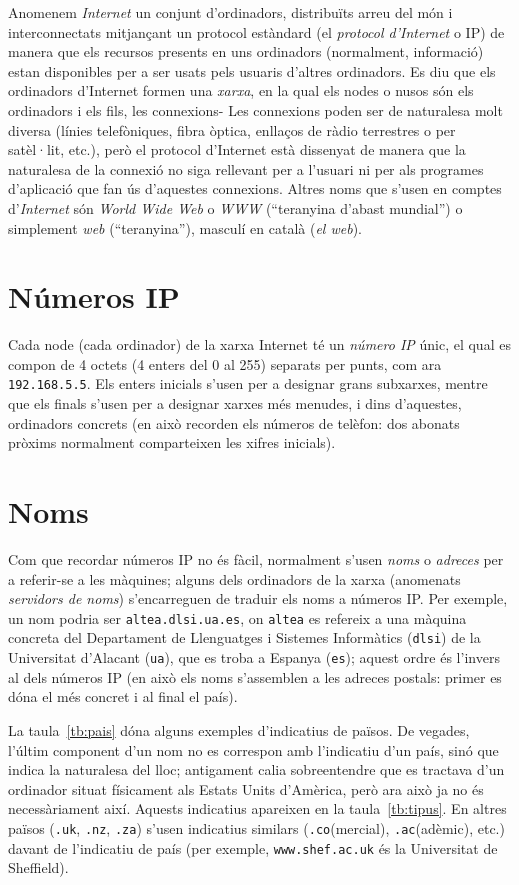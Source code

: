Anomenem \emph{Internet} un conjunt d'ordinadors, distribuïts arreu
del món i interconnectats mitjançant un protocol estàndard (el
\emph{protocol d'Internet} o IP) de manera que els recursos presents
en uns ordinadors (normalment, informació) estan disponibles per a ser
usats pels usuaris d'altres ordinadors. Es diu que els ordinadors
d'Internet formen una \emph{xarxa}, en la qual els nodes o nusos són
els ordinadors i els fils, les connexions- Les connexions poden ser de
naturalesa molt diversa (línies telefòniques, fibra òptica, enllaços
de ràdio terrestres o per satèl·lit, etc.), però el protocol
d'Internet està dissenyat de manera que la naturalesa de la connexió
no siga rellevant per a l'usuari ni per als programes d'aplicació que
fan ús d'aquestes connexions. Altres noms que s'usen en comptes
d'\emph{Internet} són \emph{World Wide Web} o \emph{WWW} (``teranyina
d'abast mundial'') o simplement \emph{web} (``teranyina''), masculí en
català (\emph{el web}).

\section{Números IP}
Cada node (cada ordinador) de la xarxa Internet té un {\em número IP}
únic, el qual es compon de 4 octets (4 enters del 0 al 255) separats
per punts, com ara {\tt 192.168.5.5}. Els enters inicials s'usen per a
designar grans subxarxes, mentre que els finals s'usen per a designar
xarxes més menudes, i dins d'aquestes, ordinadors concrets (en això
recorden els números de telèfon: dos abonats pròxims normalment
comparteixen les xifres inicials).

\section{Noms}
Com que recordar números IP no és fàcil, normalment s'usen \emph{noms}
o \emph{adreces} per a referir-se a les màquines; alguns dels
ordinadors de la xarxa (anomenats \emph{servidors de noms})
s'encarreguen de traduir els noms a números IP.  Per exemple, un nom
podria ser \texttt{altea.dlsi.ua.es}, on \texttt{altea} es refereix a
una màquina concreta del Departament de Llenguatges i Sistemes
Informàtics (\texttt{dlsi}) de la Universitat d'Alacant (\texttt{ua}),
que es troba a Espanya (\texttt{es}); aquest ordre és l'invers al dels
números IP (en això els noms s'assemblen a les adreces postals: primer
es dóna el més concret i al final el país).

La taula~\ref{tb:pais} dóna alguns exemples d'indicatius de països. De
vegades, l'últim component d'un nom no es correspon amb l'indicatiu
d'un país, sinó que indica la naturalesa del lloc; antigament calia
sobreentendre que es tractava d'un ordinador situat físicament als
Estats Units d'Amèrica, però ara això ja no és necessàriament
així. Aquests indicatius apareixen en la taula~\ref{tb:tipus}. En
altres països ({\tt .uk}, {\tt .nz}, {\tt .za}) s'usen indicatius
similars ({\tt .co}(mercial), {\tt .ac}(adèmic), etc.) davant de
l'indicatiu de país (per exemple, {\tt www.shef.ac.uk} és la
Universitat de Sheffield).

